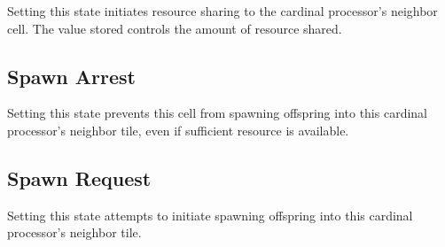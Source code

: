 
Setting this state initiates resource sharing to the cardinal processor's neighbor cell.
The value stored controls the amount of resource shared.

\subsection{Spawn Arrest}


Setting this state prevents this cell from spawning offspring into this cardinal processor's neighbor tile, even if sufficient resource is available.

\subsection{Spawn Request}


Setting this state attempts to initiate spawning offspring into this cardinal processor's neighbor tile.
